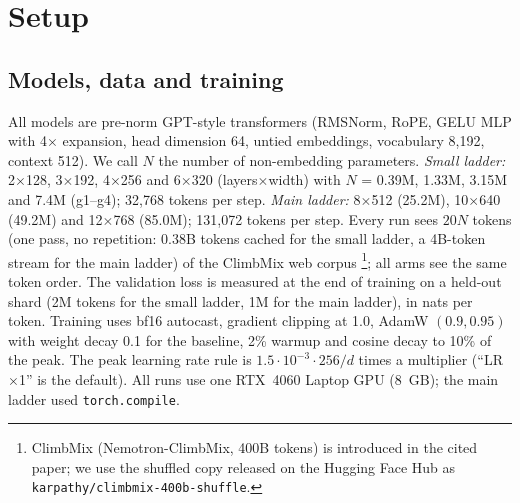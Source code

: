 \documentclass[11pt]{article}
\begin{document}
\section{Setup}
\subsection{Models, data and training}
All models are pre-norm GPT-style transformers (RMSNorm, RoPE, GELU MLP with 4$\times$ expansion, head dimension 64, untied embeddings, vocabulary 8{,}192, context 512).
We call $N$ the number of non-embedding parameters.
\emph{Small ladder:} 2$\times$128, 3$\times$192, 4$\times$256 and 6$\times$320 (layers$\times$width) with $N$ = 0.39M, 1.33M, 3.15M and 7.4M (g1--g4); 32{,}768 tokens per step.
\emph{Main ladder:} 8$\times$512 (25.2M), 10$\times$640 (49.2M) and 12$\times$768 (85.0M); 131{,}072 tokens per step.
Every run sees $20N$ tokens (one pass, no repetition: 0.38B tokens cached for the small ladder, a 4B-token stream for the main ladder) of the ClimbMix web corpus \citep{diao2025climb}\footnote{ClimbMix (Nemotron-ClimbMix, 400B tokens) is introduced in the cited paper; we use the shuffled copy released on the Hugging Face Hub as \texttt{karpathy/climbmix-400b-shuffle}.}; all arms see the same token order.
The validation loss is measured at the end of training on a held-out shard (2M tokens for the small ladder, 1M for the main ladder), in nats per token.
Training uses bf16 autocast, gradient clipping at 1.0, AdamW $(0.9,0.95)$ with weight decay 0.1 for the baseline, 2\% warmup and cosine decay to 10\% of the peak.
The peak learning rate rule is $1.5\cdot10^{-3}\cdot256/d$ times a multiplier (``LR$\times$1'' is the default).
All runs use one RTX~4060 Laptop GPU (8~GB); the main ladder used \texttt{torch.compile}.
\end{document}
